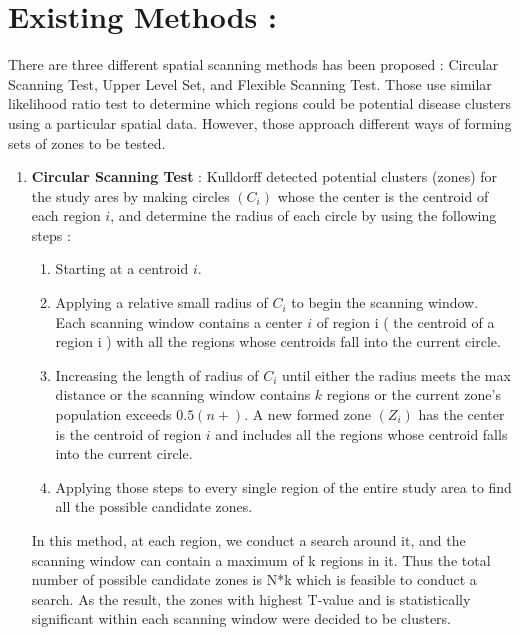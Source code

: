 \documentclass[12pt]{article}
\begin{document}
			
\section{Existing Methods :} 
			
				There are three different spatial scanning methods has been proposed : Circular Scanning Test, Upper Level Set, and Flexible Scanning Test. Those use similar likelihood ratio test to determine which regions could be potential disease clusters using a particular spatial data. However, those approach different ways of forming sets of zones to be tested.\\			
				\begin{enumerate}
			\item \textbf{Circular Scanning Test} : Kulldorff detected potential clusters (zones) for the study ares by making circles $(C_i)$ whose the center is the centroid of each region $i$, and determine the radius of each circle by using the following steps : \\
	
			\begin{enumerate}
				\item Starting at a centroid $i$. 
				\item Applying a relative small radius of $C_i$ to begin the scanning window. Each scanning window contains a center $i$ of region i ( the centroid of a region i ) with all the regions whose centroids fall into the current circle. 
				\item Increasing the length of radius of $C_i$ until either the radius meets the max distance or the scanning window contains $k$ regions or the current zone's population exceeds $0.5(n+)$. A new formed zone $(Z_i)$ has the center is the centroid of region $i$ and includes all the regions whose centroid falls into the current circle. 
				\item Applying those steps to every single region of the entire study area to find all the possible candidate zones. 
			\end{enumerate}  
		In this method, at each region, we conduct a search around it, and the scanning window can contain a maximum of k regions in it. Thus the total number of possible candidate zones is N*k which is feasible to conduct a search.
		As the result, the zones with highest T-value and is statistically significant within each scanning window were decided to be clusters. \\
			

\end{enumerate}
\end{document}
